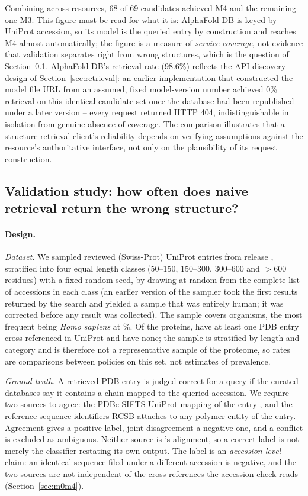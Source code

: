 Combining across resources, 68 of 69 candidates achieved M4 and the
remaining one M3. This figure must be read for what it is: AlphaFold DB is keyed
by UniProt accession, so its model is the queried entry by construction and
reaches M4 almost automatically; the figure is a measure of \emph{service
coverage}, not evidence that validation separates right from wrong structures,
which is the question of Section~\ref{sec:validation-study}. AlphaFold DB's
retrieval rate (98.6\%) reflects the API-discovery design of
Section~\ref{sec:retrieval}: an earlier implementation that constructed the
model file URL from an assumed, fixed model-version number achieved 0\%
retrieval on this identical candidate set once the database had been republished
under a later version -- every request returned HTTP 404, indistinguishable in
isolation from genuine absence of coverage. The comparison illustrates that a
structure-retrieval client's reliability depends on verifying assumptions against
the resource's authoritative interface, not only on the plausibility of its
request construction.


\subsection{Validation study: how often does naive retrieval return the wrong structure?}
\label{sec:validation-study}

\paragraph{Design.}
\emph{Dataset.} We sampled  reviewed (Swiss-Prot) UniProt entries from
release , stratified into four equal length classes (50--150,
150--300, 300--600 and $>$600 residues) with a fixed random seed, by drawing at
random from the complete list of accessions in each class (an earlier version of
the sampler took the first results returned by the search and yielded a sample
that was entirely human; it was corrected before any result was collected). The
sample covers  organisms, the most frequent being \emph{Homo sapiens}
at \%. Of the  proteins,  have at least one PDB
entry cross-referenced in UniProt and  have none; the sample is
stratified by length and category and is therefore not a representative sample of
the proteome, so rates are comparisons between policies on this set, not
estimates of prevalence.

\emph{Ground truth.} A retrieved PDB entry is judged correct for a query if the
curated databases say it contains a chain mapped to the queried accession. We
require two sources to agree: the PDBe SIFTS UniProt mapping of the entry
\citep{dana2019sifts}, and the reference-sequence identifiers RCSB
attaches to any polymer entity of the entry. Agreement gives a positive label,
joint disagreement a negative one, and a conflict is excluded as ambiguous.
Neither source is \bsi's alignment, so a correct label is not merely the
classifier restating its own output. The label is an \emph{accession-level}
claim: an identical sequence filed under a different accession is negative, and
the two sources are not independent of the cross-references the accession check
reads (Section~\ref{sec:m0m4}).


